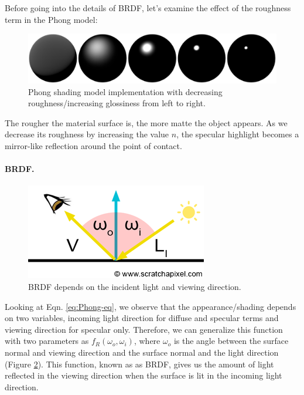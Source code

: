 Before going into the details of BRDF, let's examine the effect of the roughness term in the Phong model:

\begin{figure}[h]
  \centering
   \includegraphics[width=\linewidth]{Images/Phong-roughness-coeff.pdf}
   \caption{Phong shading model implementation with decreasing roughness/increasing glossiness from left to right.}
   \label{fig:phong-roughness}
\end{figure}

The rougher the material surface is, the more matte the object appears. As we decrease its roughness by increasing the value $n$, the specular highlight becomes a mirror-like reflection around the point of contact. 


\paragraph{BRDF.} 
\begin{figure}
  \centering
   \includegraphics[width=\linewidth]{Images/shad2-brdfdir}
   \caption{BRDF depends on the incident light and viewing direction.}
   \label{fig:brdf}
\end{figure}
Looking at Eqn. \ref{eq:Phong-eq}, we observe that the appearance/shading depends on two variables, incoming light direction for diffuse and specular terms and viewing direction for specular only. Therefore, we can generalize this function with two parameters as  $f_R(\omega_o, \omega_i)$, where  $\omega_o$ is the angle between the surface normal and viewing direction and the surface normal and the light direction (Figure \ref{fig:brdf}). This function, known as as BRDF, gives us the amount of light reflected in the viewing direction when the surface is lit in the incoming light direction.

